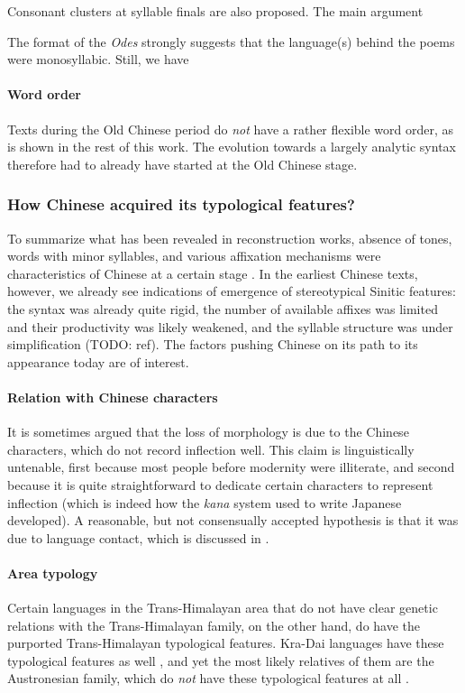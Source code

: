 \documentclass[UTF8, a4paper, oneside, scheme=plain, 12pt]{ctexrep}
\newcommand*{\citepage}[1]{p.~{#1}}
\newcommand{\form}[1]{\emph{#1}}
\newcommand{\work}[1]{\textit{#1}}
\begin{document}
Consonant clusters at syllable finals are also proposed.
The main argument 

The format of the \work{Odes} strongly suggests that
the language(s) behind the poems were monosyllabic.
Still, we have 


\paragraph*{Word order}
Texts during the Old Chinese period do \emph{not} have a rather flexible word order, as is shown in the rest of this work.
The evolution towards a largely analytic syntax therefore had to already have started at the Old Chinese stage.


\subsubsection{How Chinese acquired its typological features?}

To summarize what has been revealed in reconstruction works,
absence of tones, words with minor syllables,
and various affixation mechanisms were characteristics of Chinese 
at a certain stage \citep[\citepage{13}]{sagart1999roots}.
In the earliest Chinese texts, however, we already see indications of
emergence of stereotypical Sinitic features:
the syntax was already quite rigid,
the number of available affixes was limited and their productivity was likely weakened,
and the syllable structure was under simplification (TODO: ref).
The factors pushing Chinese on its path to its appearance today are of interest.

\paragraph*{Relation with Chinese characters}

It is sometimes argued that the loss of morphology is due to the Chinese characters,
which do not record inflection well.
This claim is linguistically untenable,
first because most people before modernity were illiterate,
and second because it is quite straightforward to dedicate certain characters to represent inflection
(which is indeed how the \form{kana} system used to write Japanese developed).
A reasonable, but not consensually accepted hypothesis is that it was due to language contact,
which is discussed in .

\paragraph*{Area typology}
Certain languages in the Trans-Himalayan area that do not have clear genetic relations with the Trans-Himalayan family, on the other hand,
do have the purported Trans-Himalayan typological features.
Kra-Dai languages have these typological features as well \citep[\citepage{434}]{sidwell2021languages},
and yet the most likely relatives of them are the Austronesian family,
which do \emph{not} have these typological features at all \citep{sagart2004higher,ostapirat2005notes}.
\end{document}
